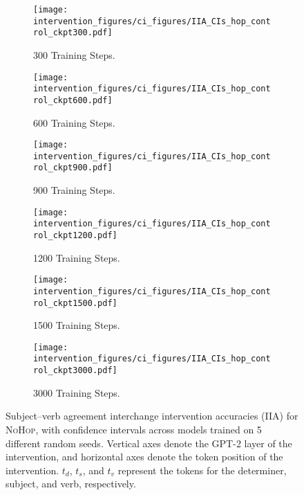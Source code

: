 \documentclass[11pt]{article}
\begin{document}
\begin{figure*}
    \centering
     \begin{subfigure}{0.3\textwidth}
         \centering
         \texttt{[image: intervention\_figures/ci\_figures/IIA\_CIs\_hop\_control\_ckpt300.pdf]}
         \caption{300 Training Steps.}
     \end{subfigure}
     \begin{subfigure}{0.3\textwidth}
         \centering
         \texttt{[image: intervention\_figures/ci\_figures/IIA\_CIs\_hop\_control\_ckpt600.pdf]}
         \caption{600 Training Steps.}
     \end{subfigure}
     \begin{subfigure}{0.3\textwidth}
         \centering
         \texttt{[image: intervention\_figures/ci\_figures/IIA\_CIs\_hop\_control\_ckpt900.pdf]}
         \caption{900 Training Steps.}
     \end{subfigure}
     \begin{subfigure}{0.3\textwidth}
         \centering
         \texttt{[image: intervention\_figures/ci\_figures/IIA\_CIs\_hop\_control\_ckpt1200.pdf]}
         \caption{1200 Training Steps.}
     \end{subfigure}
     \begin{subfigure}{0.3\textwidth}
         \centering
         \texttt{[image: intervention\_figures/ci\_figures/IIA\_CIs\_hop\_control\_ckpt1500.pdf]}
         \caption{1500 Training Steps.}
     \end{subfigure}
     \begin{subfigure}{0.3\textwidth}
         \centering
         \texttt{[image: intervention\_figures/ci\_figures/IIA\_CIs\_hop\_control\_ckpt3000.pdf]}
         \caption{3000 Training Steps.}
     \end{subfigure}
    \caption{Subject--verb agreement interchange intervention accuracies (IIA) for
    \textsc{NoHop}, with confidence intervals across models trained on 5 different random seeds. Vertical axes denote the GPT-2 layer of the intervention, and horizontal axes denote the token position of the intervention. $t_d$, $t_s$, and $t_v$ represent the tokens for the determiner, subject, and verb, respectively.}
    \label{fig:iia_ci_hop_control}
\end{figure*}
\end{document}
